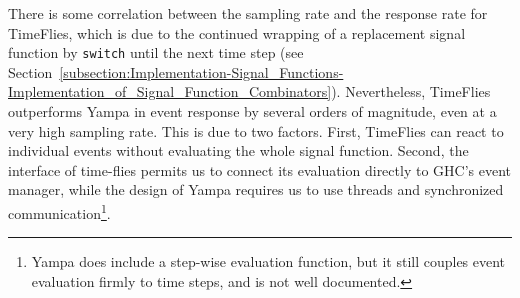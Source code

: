There is some correlation between the sampling rate and the response rate
for TimeFlies, which is due to the continued wrapping of a replacement signal
function by {\tt switch} until the next time step (see Section~\ref{subsection:Implementation-Signal_Functions-Implementation_of_Signal_Function_Combinators}).
Nevertheless, TimeFlies outperforms Yampa in event response by several orders of magnitude,
even at a very high sampling rate. This is due to two factors. First, TimeFlies can react
to individual events without evaluating the whole signal function. Second, the
interface of time-flies permits us to connect its evaluation directly to GHC's event
manager, while the design of Yampa requires us to use threads and synchronized
communication\footnote{Yampa does include a step-wise evaluation function, but
it still couples event evaluation firmly to time steps, and is not well
documented.}.

